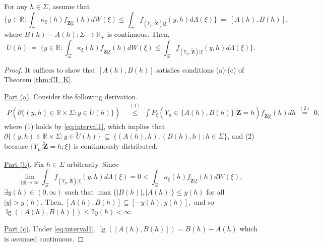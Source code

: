 \begin{lemma}\label{lem:interval1}
For any $h\in \Sigma $, assume that
\begin{equation}
\Big\{ y\in \mathbb{R}:\int_{\Xi }\kappa _{\xi }(h)f_{\tilde{\mathbf{Z}} |\xi }(h)dW(\xi )\leq \int_{\Xi }f_{(Y_{\mu },\tilde{\mathbf{Z}})|\xi }(y,h)d\Lambda (\xi )\Big\}~ =~[ A( h) ,B( h)] ,
\label{eq:interval1}
\end{equation}
where $B( h) -A( h) :\Sigma \to \mathbb{R} _{+}$ is continuous. Then,
\begin{equation*}
\tilde{U}( h) ~=~\Big\{ y\in \mathbb{R}:\int_{\Xi }\kappa _{\xi }(h)f_{\tilde{\mathbf{Z}}|\xi }(h)dW(\xi )\leq \int_{\Xi }f_{(Y_{\mu }, \tilde{\mathbf{Z}})|\xi }(y,h)d\Lambda (\xi )\Big\} .
\end{equation*}
\end{lemma}
\begin{proof}
It suffices to show that $[ A( h) ,B( h) ] $ satisfies conditions (a)-(c) of Theorem \ref{thm:CI_K}.

\underline{Part (a)}. Consider the following derivation.
\begin{align*}
P( \partial \{(y,h)\in \mathbb{R}\times \Sigma :y\in \tilde{U} (h)\}) &~\overset{(1)}{\leq} ~
\int  P_{\xi }( Y_{\mu } \in \{A( h),B(h)\} \vert \mathbf{\tilde{Z}}=h) f_{\tilde{\mathbf{Z}}|\xi }(h)dh ~\overset{(2)}{=}~0,
\end{align*}
where (1) holds by \eqref{eq:interval1}, which implies that $\partial \{(y,h) \in \mathbb{R}\times \Sigma :y\in \tilde{U}(h)\}
~\subseteq~ \{ (A( h) ,h),(B( h) ,h):h\in \Sigma\}$, and (2) because $\{ Y_{\mu }|\mathbf{ \tilde{Z}}=h;\xi \} $ is continuously distributed.

\underline{Part (b)}. Fix $h\in \Sigma $ arbitrarily. Since 
\begin{equation*}
\lim_{\vert y\vert \to \infty }\int_{\Xi }f_{(Y_{\mu },\tilde{\mathbf{Z}} )|\xi }(y,h)d\Lambda (\xi )=0<\int_{\Xi }\kappa _{\xi }(h)f_{\tilde{\mathbf{Z }}|\xi }(h)dW(\xi ), 
\end{equation*}
$\exists y( h) \in ( 0,\infty ) $ such that  $\max \{ \vert B( h) \vert ,\vert A( h) \vert \} \leq y( h) $ for all $ \vert y\vert >y( h) $. Then, $[ A( h) ,B( h) ] \subseteq [ -y( h) ,y( h) ] ,$ and so $\lg ([ A( h) ,B( h) ] )\leq 2y( h) <\infty $.

\underline{Part (c)}. Under \eqref{eq:interval1}, $\lg ([ A( h) ,B( h) ] )=B( h) -A( h) $ which is assumed continuous.
\end{proof}

